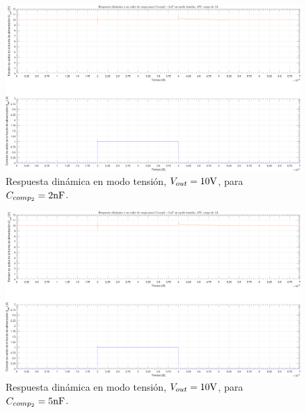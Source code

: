 \clearpage

\begin{figure}[H] %
\begin{center}
\includegraphics[width=1.1 \textwidth, angle=90]{./img/plots/dynamic/power_supply_CCOMP2_2n_STEP_Modo1.png}
\caption{\label{fig:fig_power_supply_CCOMP2_STEP_2n_Modo1}\footnotesize{Respuesta dinámica en modo tensión, $V_{out} = 10 \si[per-mode=symbol]{\volt}$, para $C_{comp_{2}} = 2 \si[per-mode=symbol]{\nano\farad} $.}}
\end{center}
\end{figure}

\clearpage

\begin{figure}[H] %
\begin{center}
\includegraphics[width=1.1 \textwidth, angle=90]{./img/plots/dynamic/power_supply_CCOMP2_5n_STEP_Modo1.png}
\caption{\label{fig:fig_power_supply_CCOMP2_STEP_5n_Modo1}\footnotesize{Respuesta dinámica en modo tensión, $V_{out} = 10 \si[per-mode=symbol]{\volt}$, para $C_{comp_{2}} = 5 \si[per-mode=symbol]{\nano\farad} $.}}
\end{center}
\end{figure}

\clearpage
